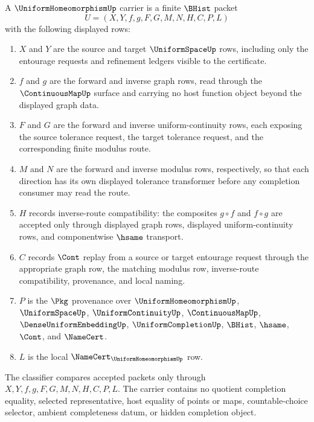 \begin{definition}
\label{def:uniform-homeomorphism-carrier}
A $\UniformHomeomorphismUp$ carrier is a finite $\BHist$ packet
$$
U=(X,Y,f,g,F,G,M,N,H,C,P,L)
$$
with the following displayed rows:
\begin{enumerate}
\item $X$ and $Y$ are the source and target $\UniformSpaceUp$ rows, including only the entourage requests and refinement ledgers visible to the certificate.
\item $f$ and $g$ are the forward and inverse graph rows, read through the $\ContinuousMapUp$ surface and carrying no host function object beyond the displayed graph data.
\item $F$ and $G$ are the forward and inverse uniform-continuity rows, each exposing the source tolerance request, the target tolerance request, and the corresponding finite modulus route.
\item $M$ and $N$ are the forward and inverse modulus rows, respectively, so that each direction has its own displayed tolerance transformer before any completion consumer may read the route.
\item $H$ records inverse-route compatibility: the composites $g\circ f$ and $f\circ g$ are accepted only through displayed graph rows, displayed uniform-continuity rows, and componentwise $\hsame$ transport.
\item $C$ records $\Cont$ replay from a source or target entourage request through the appropriate graph row, the matching modulus row, inverse-route compatibility, provenance, and local naming.
\item $P$ is the $\Pkg$ provenance over $\UniformHomeomorphismUp$, $\UniformSpaceUp$, $\UniformContinuityUp$, $\ContinuousMapUp$, $\DenseUniformEmbeddingUp$, $\UniformCompletionUp$, $\BHist$, $\hsame$, $\Cont$, and $\NameCert$.
\item $L$ is the local $\NameCert_{\UniformHomeomorphismUp}$ row.
\end{enumerate}
The classifier compares accepted packets only through $X,Y,f,g,F,G,M,N,H,C,P,L$. The carrier contains no quotient completion equality, selected representative, host equality of points or maps, countable-choice selector, ambient completeness datum, or hidden completion object.
\end{definition}


